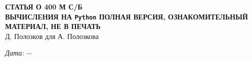 \documentclass[14pt,twocolumn]{extarticle}
\theoremstyle{remark}
\newcommand{\todayYYMMDD}{\the\year-\the\month-\the\day}
\begin{document}
\begin{center}
{\large\bfseries\MakeUppercase{Статья о 400 м с/б}}\\
{\normalsize\bfseries\MakeUppercase{Вычисления на \texttt{Python} полная версия, ознакомительный материал, не в печать}}\\[0.5em]
{\normalsize Д. Полозков для А. Полозкова}
\end{center}

\noindent\textit{Дата: \todayYYMMDD}
\end{document}
